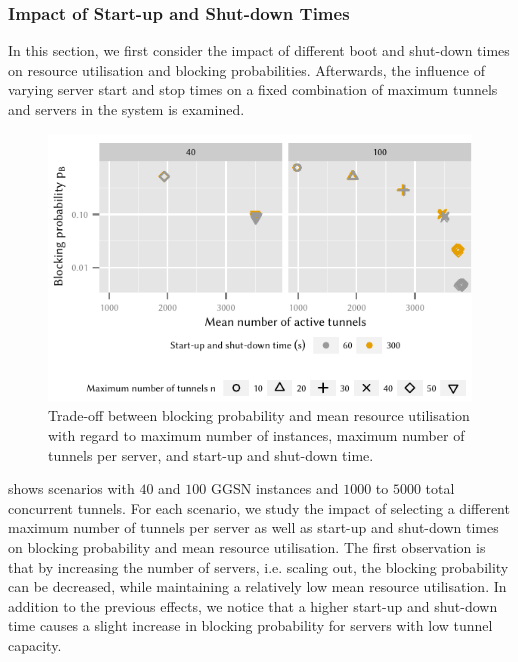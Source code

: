 \subsubsection*{Impact of Start-up and Shut-down Times}\label{sec:cloud_virtualized_network_functions:startup_shutdown}

In this section, we first consider the impact of different boot and shut-down times on resource utilisation and blocking probabilities.
Afterwards, the influence of varying server start and stop times on a fixed combination of maximum tunnels and servers in the system is examined.

\begin{figure}
  \centering
  \includegraphics{cloud/virtualized_network_functions/performance_evaluation/figures/compare_util_block}
  \caption{Trade-off between blocking probability and mean resource utilisation with regard to maximum number of instances, maximum number of tunnels per server, and start-up and shut-down time.}
  \label{fig:cloud_virtualized_network_functions:startup_shutdown:compare_util_block}
\end{figure}

 shows scenarios with \(40\) and \(100\) \gls{GGSN} instances and  \(1000\) to \(5000\) total concurrent tunnels.
For each scenario, we study the impact of selecting a different maximum number of tunnels per server as well as start-up and shut-down times on blocking probability and mean resource utilisation.
The first observation is that by increasing the number of servers, i.e. scaling out, the blocking probability can be decreased, while maintaining a relatively low mean resource utilisation.
In addition to the previous effects, we notice that a higher start-up and shut-down time causes a slight increase in blocking probability for servers with low tunnel capacity.


